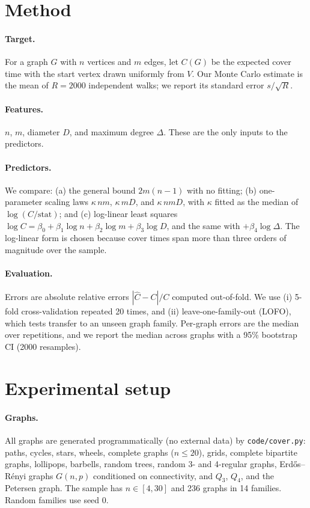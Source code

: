 \documentclass{article} %
\newcommand{\cover}{C}
\begin{document}
\section{Method}
\paragraph{Target.} For a graph $G$ with $n$ vertices and $m$ edges, let $\cover(G)$ be the expected cover time with the start vertex drawn uniformly from $V$. Our Monte Carlo estimate is the mean of $R=2000$ independent walks; we report its standard error $s/\sqrt{R}$.

\paragraph{Features.} $n$, $m$, diameter $D$, and maximum degree $\Delta$. These are the only inputs to the predictors.

\paragraph{Predictors.} We compare: (a) the general bound $2m(n-1)$ with no fitting; (b) one-parameter scaling laws $\kappa\, nm$, $\kappa\, mD$, and $\kappa\, nmD$, with $\kappa$ fitted as the median of $\log(\cover/\text{stat})$; and (c) log-linear least squares $\log\cover = \beta_0+\beta_1\log n+\beta_2\log m+\beta_3\log D$, and the same with $+\beta_4\log\Delta$. The log-linear form is chosen because cover times span more than three orders of magnitude over the sample.

\paragraph{Evaluation.} Errors are absolute relative errors $|\hat\cover-\cover|/\cover$ computed out-of-fold. We use (i) 5-fold cross-validation repeated 20 times, and (ii) leave-one-family-out (LOFO), which tests transfer to an unseen graph family. Per-graph errors are the median over repetitions, and we report the median across graphs with a 95\% bootstrap CI (2000 resamples).

\section{Experimental setup}
\paragraph{Graphs.} All graphs are generated programmatically (no external data) by \texttt{code/cover.py}: paths, cycles, stars, wheels, complete graphs ($n\le 20$), grids, complete bipartite graphs, lollipops, barbells, random trees, random 3- and 4-regular graphs, Erd\H{o}s--R\'enyi graphs $G(n,p)$ conditioned on connectivity, and $Q_3$, $Q_4$, and the Petersen graph. The sample has $n\in[4,30]$ and 236 graphs in 14 families. Random families use seed 0.
\end{document}
